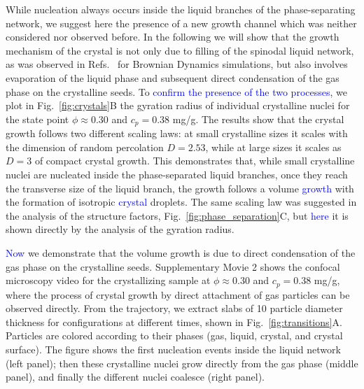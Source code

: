 \documentclass[12pt]{article}
\begin{document}
While nucleation always occurs inside the liquid branches of the phase-separating network, we suggest here the presence of a new growth channel
which was neither considered nor observed before. In the following we will show that the growth mechanism of the crystal is not only due to filling of the spinodal liquid network, as was observed in Refs.~\cite{fortini2008crystallization,perez2011pathways} for Brownian Dynamics simulations, but also involves 
evaporation of the liquid phase and subsequent direct condensation of the gas phase on the crystalline seeds. 
To \textcolor{blue}{confirm the presence of the two processes}, we plot in Fig.~\ref{fig:crystals}B the gyration radius of individual crystalline nuclei for the state point 
$\phi\approx 0.30$ and $c_p=0.38$ mg/g. The results show that the crystal growth follows two different scaling laws: at small crystalline sizes it scales with 
the dimension of random percolation $D=2.53$, while at large sizes it scales as $D=3$ of compact crystal growth. This demonstrates that, while 
small crystalline nuclei are nucleated inside the phase-separated liquid branches, once they reach the transverse size of the liquid branch, the growth 
follows a volume \textcolor{blue}{growth} with the formation of isotropic \textcolor{blue}{crystal} droplets. The same scaling law was suggested in the analysis of the
structure factors, Fig.~\ref{fig:phase_separation}C, but \textcolor{blue}{here} it is shown directly by the analysis of the gyration radius. 

\textcolor{blue}{Now} we demonstrate that the volume growth is due to direct condensation of the gas phase on the crystalline seeds.
Supplementary Movie 2 shows the confocal microscopy video for the crystallizing sample at $\phi\approx 0.30$ and $c_p=0.38$ mg/g,
where the process of crystal growth by direct attachment of gas particles can be observed directly. 
From the trajectory, we extract slabs of 10 particle diameter thickness for configurations at different times, shown in Fig.~\ref{fig:transitions}A. 
Particles are colored according to their phases (gas, liquid, crystal, and crystal surface). The figure shows the first nucleation 
events inside the liquid network (left panel); then these crystalline nuclei grow directly from the gas phase (middle panel), and finally
the different nuclei coalesce (right panel). 

\end{document}
